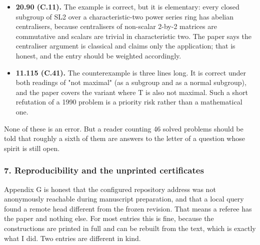 \begin{itemize}
  \textbf{12.40 (C.31).} The problem asks for the best possible estimate
  of the p-part of a Brauer character degree in terms of the p-part of
  the group order. The paper shows no finite bound exists. That is a
  legitimate answer to the printed request, but "find the best possible
  estimate" suggests the proposer had a restricted class in mind.
\item
  \textbf{20.90 (C.11).} The example is correct, but it is elementary:
  every closed subgroup of SL2 over a characteristic-two power series
  ring has abelian centralisers, because centralisers of non-scalar
  2-by-2 matrices are commutative and scalars are trivial in
  characteristic two. The paper says the centraliser argument is
  classical and claims only the application; that is honest, and the
  entry should be weighted accordingly.
\item
  \textbf{11.115 (C.41).} The counterexample is three lines long. It is
  correct under both readings of "not maximal" (as a subgroup and as a
  normal subgroup), and the paper covers the variant where T is also not
  maximal. Such a short refutation of a 1990 problem is a priority risk
  rather than a mathematical one.
\end{itemize}

None of these is an error. But a reader counting 46 solved problems
should be told that roughly a sixth of them are answers to the letter of
a question whose spirit is still open.

\hypertarget{review-md-reproducibility-and-the-unprinted-certificates}{%
\subsubsection*{7. Reproducibility and the unprinted
certificates}\label{review-md-reproducibility-and-the-unprinted-certificates}}

Appendix G is honest that the configured repository address was not
anonymously reachable during manuscript preparation, and that a local
query found a remote head different from the frozen revision. That means
a referee has the paper and nothing else. For most entries this is fine,
because the constructions are printed in full and can be rebuilt from
the text, which is exactly what I did. Two entries are different in
kind.

